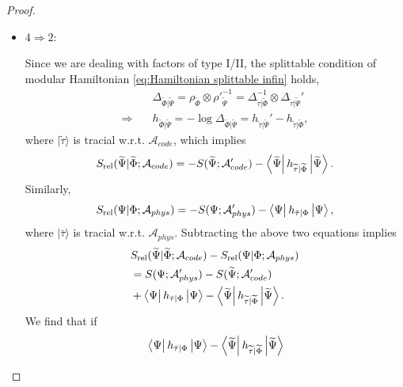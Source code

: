 \documentclass[a4paper,11pt]{article}
\newcommand{\ket}[1]{| #1 \rangle } %
\newcommand{\diracprod}[3]{\left\langle  #1 \vphantom{#2#3} \right|#2 \left| #3 \vphantom{#1#2} \right\rangle } %
\renewcommand{\=}[1]{\stackrel{#1}{=}} %
\def\A{\mathcal{A}}
\def\Srel{S_{\text{rel}}}
\begin{document}
\begin{proof}
\begin{itemize}
		Likewise for $S(\widetilde{\Psi};\A'_{code})=S(\Psi;\A'_{phys})$.
		
		
		
		
		\item $4\Rightarrow2$: 
		
		Since we are dealing with factors of type I/II, the splittable condition of modular Hamiltonian \eqref{eq:Hamiltonian splittable infin} holds,
		\begin{equation}
			\begin{aligned}
				&\Delta_{\widetilde{\Phi}|\widetilde{\Psi}}=\rho_{\widetilde{\Phi}}\otimes\rho'^{-1}_{\widetilde{\Psi}}=\Delta^{-1}_{\widetilde{\tau}|\widetilde{\Phi}}\otimes \Delta_{\widetilde{\tau}|\widetilde{\Psi}}'\\
				\Rightarrow\quad &h_{\widetilde{\Phi}|\widetilde{\Psi}}=-\log\Delta_{\widetilde{\Phi}|\widetilde{\Psi}}=h_{\widetilde{\tau}|\widetilde{\Psi}}'-h_{\widetilde{\tau}|\widetilde{\Phi}},
			\end{aligned}
		\end{equation} 
		where $\ket{\widetilde{\tau}}$ is tracial w.r.t. $\A_{code}$, which implies
		\begin{equation}
			\Srel(\widetilde{\Psi}|\widetilde{\Phi};\A_{code})=-S(\widetilde{\Psi};\A'_{code})-\diracprod{\widetilde{\Psi}}{h_{\widetilde{\tau}|\widetilde{\Phi}}}{\widetilde{\Psi}}.
		\end{equation} 
		Similarly,
		\begin{equation}
			\Srel(\Psi|\Phi;\A_{phys})=-S(\Psi;\A'_{phys})-\diracprod{\Psi}{h_{\bar{\tau }|\Phi}}{\Psi},
		\end{equation}
		where $\ket{\bar{\tau }}$ is tracial w.r.t. $\A_{phys}$. Subtracting the above two equations implies
		\begin{equation}
			\begin{aligned}
				&\Srel(\widetilde{\Psi}|\widetilde{\Phi};\A_{code})-\Srel(\Psi|\Phi;\A_{phys})\\
				&=S(\Psi;\A'_{phys})-S(\widetilde{\Psi};\A'_{code})\\
				&+\diracprod{\Psi}{h_{\bar{\tau }|\Phi}}{\Psi}-\diracprod{\widetilde{\Psi}}{h_{\widetilde{\tau}|\widetilde{\Phi}}}{\widetilde{\Psi}}.
			\end{aligned}
		\end{equation} 
		We find that if
		\begin{equation}
			\begin{aligned}
				&\diracprod{\Psi}{h_{\bar{\tau }|\Phi}}{\Psi}-\diracprod{\widetilde{\Psi}}{h_{\widetilde{\tau}|\widetilde{\Phi}}}{\widetilde{\Psi}}\\

\end{aligned}
\end{equation}
\end{itemize}
\end{proof}
\end{document}
